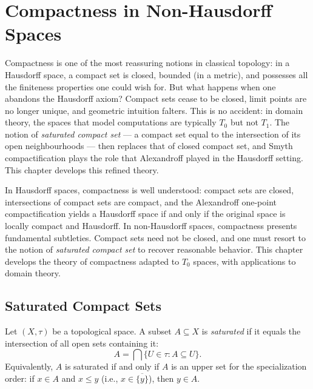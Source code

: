 \chapter{Compactness in Non-Hausdorff Spaces}
\label{ch:compactness}

Compactness is one of the most reassuring notions in classical topology: in a Hausdorff space, a compact set is closed, bounded (in a metric), and possesses all the finiteness properties one could wish for. But what happens when one abandons the Hausdorff axiom? Compact sets cease to be closed, limit points are no longer unique, and geometric intuition falters. This is no accident: in domain theory, the spaces that model computations are typically $T_0$ but not $T_1$. The notion of \emph{saturated compact set} --- a compact set equal to the intersection of its open neighbourhoods --- then replaces that of closed compact set, and Smyth compactification plays the role that Alexandroff played in the Hausdorff setting. This chapter develops this refined theory.

\begin{intuition}
In Hausdorff spaces, compactness is well understood: compact sets are closed, intersections
of compact sets are compact, and the Alexandroff one-point compactification yields a Hausdorff
space if and only if the original space is locally compact and Hausdorff. In non-Hausdorff
spaces, compactness presents fundamental subtleties. Compact sets need not be closed, and one
must resort to the notion of \emph{saturated compact set} to recover reasonable behavior.
This chapter develops the theory of compactness adapted to $T_0$ spaces, with applications
to domain theory.
\end{intuition}

\section{Saturated Compact Sets}

\begin{definition}
Let $(X,\tau)$ be a topological space. A subset $A \subseteq X$ is \emph{saturated} if it
equals the intersection of all open sets containing it:
\[
  A = \bigcap \{ U \in \tau : A \subseteq U \}.
\]
Equivalently, $A$ is saturated if and only if $A$ is an upper set for the specialization
order: if $x \in A$ and $x \leq y$ (i.e., $x \in \overline{\{y\}}$), then $y \in A$.
\end{definition}

